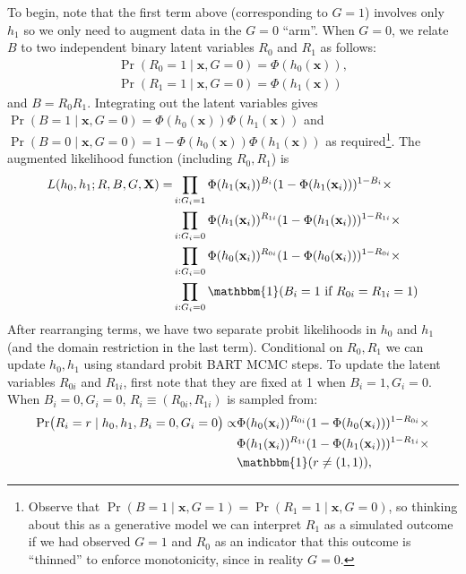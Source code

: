 \documentclass[aoas,preprint, 11pt, dvipsnames, table, x11name]{imsart}
\newcommand{\ind}[1]{\mathbbm{1}({#1})}%
\theoremstyle{remark}
\begin{document}
	To begin, note that the first term above (corresponding to $G=1$) involves only $h_1$ so we only need to augment data in the $G=0$ ``arm''. When $G=0$, we relate $B$ to two independent binary latent variables $R_0$ and $R_1$  as follows:
	\begin{gather*}
		\Pr(R_0=1\mid\mathbf{x}, G=0) = \Phi(h_0(\mathbf{x})),\\
		\Pr(R_1=1\mid\mathbf{x}, G=0) = \Phi(h_1(\mathbf{x}))\label{eq:Rprobs}
	\end{gather*}
	and $B = R_0R_1$. Integrating out the latent variables gives $\Pr(B=1\mid\mathbf{x}, G=0) = \Phi(h_0(\mathbf{x}))\Phi(h_1(\mathbf{x}))$ and $\Pr(B=0\mid\mathbf{x}, G=0) = 1-\Phi(h_0(\mathbf{x}))\Phi(h_1(\mathbf{x}))$ as required\footnote{Observe that $\Pr(B=1\mid\mathbf{x}, G=1) = \Pr(R_1=1\mid\mathbf{x}, G=0)$, so thinking about this as a generative model we can interpret $R_1$ as a simulated outcome if we had observed $G=1$ and $R_0$ as an indicator that this outcome is ``thinned'' to enforce monotonicity, since in reality $G=0$.}. 
	The augmented likelihood function (including $R_0, R_1$) is 
	\begin{equation}
		\begin{split}
			L(h_0, h_1; R, B, G, \mathbf{X}) =&\prod_{i: G_i=1}\Phi(h_1(\mathbf{x}_i))^{B_i}(1-\Phi(h_1(\mathbf{x}_i)))^{1-B_i} \times \\
			&\prod_{i: G_i=0} \Phi(h_1(\mathbf{x}_i))^{R_{1i}}(1-\Phi(h_1(\mathbf{x}_i)))^{1-R_{1i}}\times \\
			&\prod_{i: G_i=0}\Phi(h_0(\mathbf{x}_i))^{R_{0i}}(1-\Phi(h_0(\mathbf{x}_i)))^{1-R_{0i}}\times\\
			&\prod_{i: G_i=0}\ind{B_i = 1\text{ if }R_{0i}=R_{1i}=1} 
			\label{eq:bart-da1}
		\end{split}
	\end{equation}
	After rearranging terms, we have two separate probit likelihoods in $h_0$ and $h_1$ (and the domain restriction in the last term). Conditional on $R_0, R_1$ we can update $h_0, h_1$ using standard probit BART MCMC steps. To update the latent variables $R_{0i}$ and $R_{1i}$, first note that they are fixed at 1 when $B_i=1, G_i=0$. When $B_i=0, G_i=0$, $R_i\equiv (R_{0i}, R_{1i})$ is sampled from:
	\begin{equation}
		\begin{split}
			\Pr(R_i=r\mid h_0, h_1, B_i=0, G_i=0)\propto
			&\Phi(h_0(\mathbf{x}_i))^{R_{0i}}(1-\Phi(h_0(\mathbf{x}_i)))^{1-R_{0i}}\times\\
			&\Phi(h_1(\mathbf{x}_i))^{R_{1i}}(1-\Phi(h_1(\mathbf{x}_i)))^{1-R_{1i}}\times \\
			&\ind{r\neq (1,1)},
		\end{split}
	\end{equation}
\end{document}
